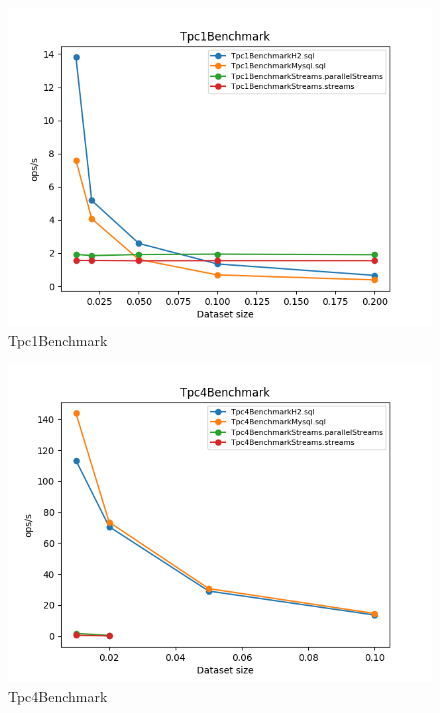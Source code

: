 \documentclass[12pt]{extarticle}
\begin{document}
\begin{figure}[H]
\centering
\includegraphics[width=15cm]{plots/Tpc1Benchmark}
\caption{Tpc1Benchmark}
\end{figure}

\begin{figure}[H]
\centering
\includegraphics[width=15cm]{plots/Tpc4Benchmark}
\caption{Tpc4Benchmark}
\end{figure}
\end{document}
